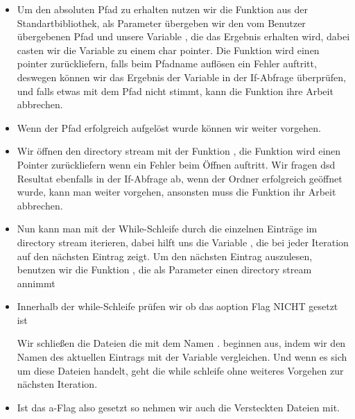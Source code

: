 \begin{itemize}
\item Um den absoluten Pfad zu erhalten nutzen wir die Funktion
\newline
{}
\newline
aus der Standartbibliothek,
als Parameter übergeben wir den vom Benutzer übergebenen Pfad 
und unsere Variable , die das Ergebnis erhalten wird,
dabei casten wir die Variable  zu einem char pointer.
Die Funktion wird einen  pointer zurückliefern, falls beim Pfadname auflösen ein Fehler auftritt,
deswegen können wir das Ergebnis der Variable  in der If-Abfrage überprüfen,
und falls etwas mit dem Pfad nicht stimmt, kann die Funktion  ihre Arbeit abbrechen.
\item Wenn der Pfad erfolgreich aufgelöst wurde können wir weiter vorgehen.
\item Wir öffnen den directory stream mit der Funktion ,
die Funktion wird einen  Pointer zurückliefern wenn ein Fehler beim Öffnen auftritt.
Wir fragen dsd Resultat ebenfalls in der If-Abfrage ab, wenn der Ordner erfolgreich geöffnet wurde,
kann man weiter vorgehen, ansonsten muss die Funktion  ihr Arbeit abbrechen.


\item Nun kann man mit der While-Schleife durch die einzelnen Einträge im
directory stream iterieren,
dabei hilft uns die Variable , die bei jeder Iteration auf
den nächsten Eintrag zeigt.
Um den nächsten Eintrag auszulesen, benutzen wir die Funktion ,
die als Parameter einen directory stream annimmt


\item Innerhalb der while-Schleife prüfen wir ob das aoption Flag NICHT gesetzt ist

Wir schließen die Dateien die mit dem Namen \textit{.} beginnen aus,
indem wir den Namen des aktuellen Eintrags mit der Variable  vergleichen.
Und wenn es sich um diese Dateien handelt, geht die while schleife
ohne weiteres Vorgehen zur nächsten Iteration.


\item Ist das a-Flag also gesetzt so nehmen wir auch die Versteckten Dateien
mit.


\end{itemize}
